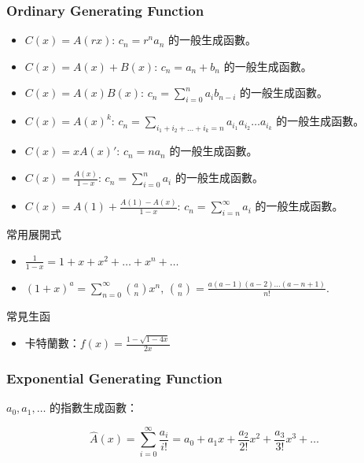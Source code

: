 \subsubsection{Ordinary Generating Function}

\begin{itemize}
    \item $C(x) = A(rx)$: $c_n = r^na_n$ 的一般生成函數。
    \item $C(x) = A(x) + B(x)$: $c_n = a_n + b_n$ 的一般生成函數。
    \item $C(x) = A(x)B(x)$: $c_n = \sum\limits_{i = 0}^n a_ib_{n - i}$ 的一般生成函數。
    \item $C(x) = A(x)^k$: $c_n = \sum\limits_{i_1 + i_2 + \ldots + i_k = n} a_{i_1}a_{i_2} \ldots a_{i_k}$ 的一般生成函數。
    \item $C(x) = xA(x)'$: $c_n = na_n$ 的一般生成函數。
    \item $C(x) = \frac{A(x)}{1 - x}$: $c_n = \sum\limits_{i = 0}^n a_i$ 的一般生成函數。
	\item $C(x) = A(1) + \frac{A(1) - A(x)}{1-x}$: $c_n = \sum\limits_{i=n}^{\infty} a_i$ 的一般生成函數。
\end{itemize}

常用展開式
\begin{itemize}
    \item $\frac{1}{1 - x} = 1 + x + x^2 + \ldots + x^n + \ldots$
    \item $(1 + x)^a = \sum\limits_{n = 0}^{\infty} \binom{a}{n} x^n, \, \binom{a}{n} = \frac{a(a - 1)(a - 2) \ldots (a - n + 1)}{n!}$.
\end{itemize}

常見生函
\begin{itemize}
	\item 卡特蘭數：$f(x) = \frac{1 - \sqrt{1-4x}}{2x}$
\end{itemize}

\subsubsection{Exponential Generating Function}

$a_0,a_1,\dots$ 的指數生成函數：

\[\hat A(x) = \sum_{i=0}^\infty \frac{a_i}{i!} = a_0 + a_1x + \frac{a_2}{2!}x^2 + \frac{a_3}{3!}x^3 + \dots\]


